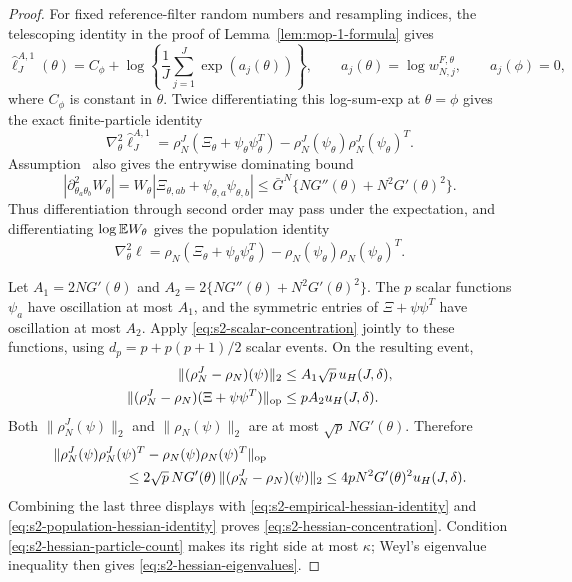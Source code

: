 \begin{proof}
For fixed reference-filter random numbers and resampling indices, the
telescoping identity in the proof of Lemma~\ref{lem:mop-1-formula} gives
\begin{equation*}
\hat\ell_J^{A,1}(\theta)
=C_\phi+\log\left\{\frac1J\sum_{j=1}^J\exp(a_j(\theta))\right\},
\qquad a_j(\theta)=\log w_{N,j}^{F,\theta},\qquad a_j(\phi)=0,
\end{equation*}
where $C_\phi$ is constant in $\theta$.  Twice differentiating this log-sum-exp at
$\theta=\phi$ gives the exact finite-particle identity
\begin{equation}
\nabla_\theta^2\hat\ell_J^{A,1}
=\rho_N^J(\Xi_\theta+\psi_\theta\psi_\theta^T)
 -\rho_N^J(\psi_\theta)\rho_N^J(\psi_\theta)^T.                \label{eq:s2-empirical-hessian-identity}
\end{equation}
Assumption~{} also gives the entrywise dominating
bound
\begin{equation*}
|\partial_{\theta_a\theta_b}^2W_\theta|
=W_\theta|\Xi_{\theta,ab}+\psi_{\theta,a}\psi_{\theta,b}|
\leq\bar G^N\{NG''(\theta)+N^2G'(\theta)^2\}.
\end{equation*}
Thus differentiation through second order may pass under the expectation, and
differentiating $\log\mathbb{E} W_\theta$ gives the population identity
\begin{equation}
\nabla_\theta^2\ell
=\rho_N(\Xi_\theta+\psi_\theta\psi_\theta^T)
 -\rho_N(\psi_\theta)\rho_N(\psi_\theta)^T.                   \label{eq:s2-population-hessian-identity}
\end{equation}

Let $A_1=2NG'(\theta)$ and
$A_2=2\{NG''(\theta)+N^2G'(\theta)^2\}$.  The $p$ scalar functions
$\psi_a$ have oscillation at most $A_1$, and the symmetric entries of
$\Xi+\psi\psi^T$ have oscillation at most $A_2$.  Apply
\eqref{eq:s2-scalar-concentration} jointly to these functions, using
$d_p=p+p(p+1)/2$ scalar events.  On the resulting event,
\begin{align*}
\|(\rho_N^J-\rho_N)(\psi)\|_2
 &\leq A_1\sqrt p\,u_H(J,\delta),\\
\|(\rho_N^J-\rho_N)(\Xi+\psi\psi^T)\|_{\rm op}
 &\leq pA_2u_H(J,\delta).
\end{align*}
Both $\|\rho_N^J(\psi)\|_2$ and $\|\rho_N(\psi)\|_2$ are at most
$\sqrt p\,N G'(\theta)$.  Therefore
\begin{align*}
&\|\rho_N^J(\psi)\rho_N^J(\psi)^T
       -\rho_N(\psi)\rho_N(\psi)^T\|_{\rm op}\\
&\hspace{18mm}\leq
2\sqrt p\,N G'(\theta)\,
 \|(\rho_N^J-\rho_N)(\psi)\|_2
\leq4pN^2G'(\theta)^2u_H(J,\delta).
\end{align*}
Combining the last three displays with
\eqref{eq:s2-empirical-hessian-identity} and
\eqref{eq:s2-population-hessian-identity} proves
\eqref{eq:s2-hessian-concentration}.  Condition
\eqref{eq:s2-hessian-particle-count} makes its right side at most $\kappa$;
Weyl's eigenvalue inequality then gives
\eqref{eq:s2-hessian-eigenvalues}.
\end{proof}

